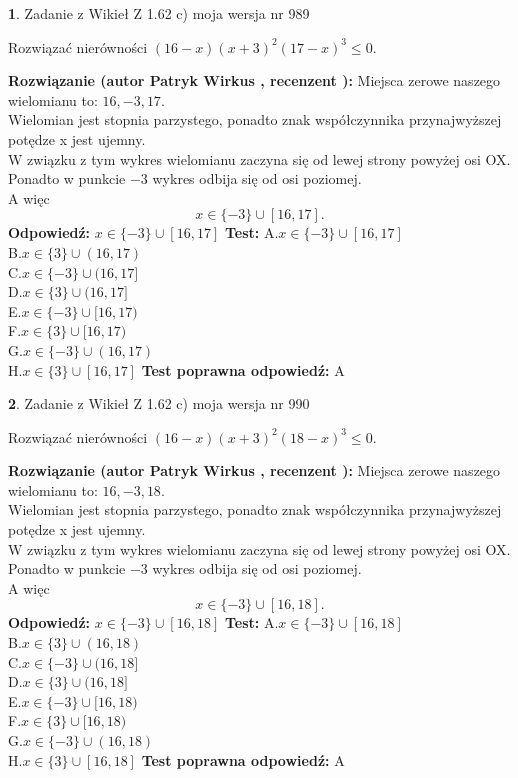 \documentclass[12pt, a4paper]{article}
\theoremstyle{definition} %
\newtheorem{zad}{}
\newcommand{\zadStart}[1]{\begin{zad}#1\newline}
\newcommand{\zadStop}{\end{zad}}
\newcommand{\rozwStart}[2]{\noindent \textbf{Rozwiązanie (autor #1 , recenzent #2): }\newline}
\newcommand{\rozwStop}{\newline}
\newcommand{\odpStart}{\noindent \textbf{Odpowiedź:}\newline}
\newcommand{\odpStop}{\newline}
\newcommand{\testStart}{\noindent \textbf{Test:}\newline}
\newcommand{\testStop}{\newline}
\newcommand{\kluczStart}{\noindent \textbf{Test poprawna odpowiedź:}\newline}
\newcommand{\kluczStop}{\newline}
\begin{document}
\zadStart{Zadanie z Wikieł Z 1.62 c) moja wersja nr 989}

Rozwiązać nierówności $(16-x)(x+3)^{2}(17-x)^{3}\le0$.
\zadStop
\rozwStart{Patryk Wirkus}{}
Miejsca zerowe naszego wielomianu to: $16, -3, 17$.\\
Wielomian jest stopnia parzystego, ponadto znak współczynnika przy\linebreak najwyższej potędze x jest ujemny.\\ W związku z tym wykres wielomianu zaczyna się od lewej strony powyżej osi OX.\\
Ponadto w punkcie $-3$ wykres odbija się od osi poziomej.\\
A więc $$x \in \{-3\} \cup [16,17].$$
\rozwStop
\odpStart
$x \in \{-3\} \cup [16,17]$
\odpStop
\testStart
A.$x \in \{-3\} \cup [16,17]$\\
B.$x \in \{3\} \cup (16,17)$\\
C.$x \in \{-3\} \cup (16,17]$\\
D.$x \in \{3\} \cup (16,17]$\\
E.$x \in \{-3\} \cup [16,17)$\\
F.$x \in \{3\} \cup [16,17)$\\
G.$x \in \{-3\} \cup (16,17)$\\
H.$x \in \{3\} \cup [16,17]$
\testStop
\kluczStart
A
\kluczStop



\zadStart{Zadanie z Wikieł Z 1.62 c) moja wersja nr 990}

Rozwiązać nierówności $(16-x)(x+3)^{2}(18-x)^{3}\le0$.
\zadStop
\rozwStart{Patryk Wirkus}{}
Miejsca zerowe naszego wielomianu to: $16, -3, 18$.\\
Wielomian jest stopnia parzystego, ponadto znak współczynnika przy\linebreak najwyższej potędze x jest ujemny.\\ W związku z tym wykres wielomianu zaczyna się od lewej strony powyżej osi OX.\\
Ponadto w punkcie $-3$ wykres odbija się od osi poziomej.\\
A więc $$x \in \{-3\} \cup [16,18].$$
\rozwStop
\odpStart
$x \in \{-3\} \cup [16,18]$
\odpStop
\testStart
A.$x \in \{-3\} \cup [16,18]$\\
B.$x \in \{3\} \cup (16,18)$\\
C.$x \in \{-3\} \cup (16,18]$\\
D.$x \in \{3\} \cup (16,18]$\\
E.$x \in \{-3\} \cup [16,18)$\\
F.$x \in \{3\} \cup [16,18)$\\
G.$x \in \{-3\} \cup (16,18)$\\
H.$x \in \{3\} \cup [16,18]$
\testStop
\kluczStart
A
\kluczStop
\end{document}
